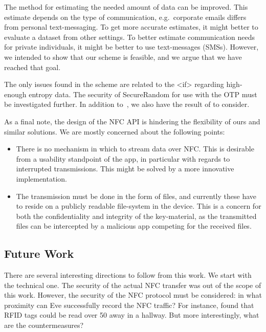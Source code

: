The method for estimating the needed amount of data can be improved.
This estimate depends on the type of communication, e.g.~corporate emails 
differs from personal text-messaging.
To get more accurate estimates, it might better to evaluate a dataset from 
other settings.
To better estimate communication needs for private individuals, it might be 
better to use text-messages (SMSs).
However, we intended to show that our scheme is feasible, and we argue that we 
have reached that goal.

The only issues found in the scheme are related to the <if> regarding 
high-enough entropy data.
The security of SecureRandom for use with the \ac{OTP} must be investigated 
further.
In addition to~\cite{JavaRandomness,AndroidLowEntropyMyth}, we also have the 
result of \citet{UniversalityOTP} to consider.

As a final note, the design of the \ac{NFC} API is hindering the flexibility of 
ours and similar solutions.
We are mostly concerned about the following points:
\begin{itemize}
  \item There is no mechanism in which to stream data over \ac{NFC}\@.
    This is desirable from a usability standpoint of the app, in particular 
    with regards to interrupted transmissions.
    This might be solved by a more innovative implementation.
  \item The transmission must be done in the form of files, and currently these 
    have to reside on a publicly readable file-system in the device.
    This is a concern for both the confidentiality and integrity of the 
    key-material, as the transmitted files can be intercepted by a malicious 
    app competing for the received files.
\end{itemize}

\subsection{Future Work}

There are several interesting directions to follow from this work.
We start with the technical one.
The security of the actual \ac{NFC} transfer was out of the scope of this work.
However, the security of the \ac{NFC} protocol must be considered: in what 
proximity can Eve successfully record the \ac{NFC} traffic?
For instance, \citet{RFIDProximity} found that RFID tags could be read over 
\unit{50}{\metre} away in a hallway.
But more interestingly, what are the countermeasures?

